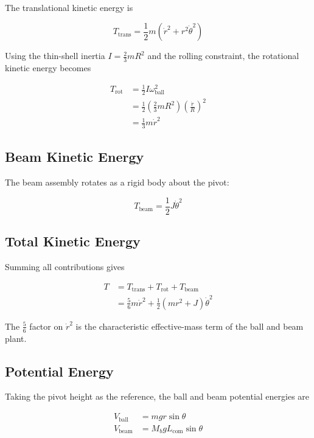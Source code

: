 The translational kinetic energy is

\begin{equation}
  T_{\text{trans}} = \frac{1}{2} m \left(\dot{r}^2 + r^2\dot{\theta}^2\right)
\end{equation}

Using the thin-shell inertia $I = \tfrac{2}{3}mR^2$ and the rolling constraint, the
rotational kinetic energy becomes

\begin{align}
  T_{\text{rot}}
  &= \frac{1}{2} I \omega_{\text{ball}}^2 \\
  &= \frac{1}{2}\left(\frac{2}{3}mR^2\right)\left(\frac{\dot{r}}{R}\right)^2 \\
  &= \frac{1}{3} m \dot{r}^2
\end{align}

\subsection{Beam Kinetic Energy}

The beam assembly rotates as a rigid body about the pivot:

\begin{equation}
  T_{\text{beam}} = \frac{1}{2} J \dot{\theta}^2
\end{equation}

\subsection{Total Kinetic Energy}

Summing all contributions gives

\begin{align}
  T
  &= T_{\text{trans}} + T_{\text{rot}} + T_{\text{beam}} \\
  &= \frac{5}{6}m\dot{r}^2 + \frac{1}{2}\left(mr^2 + J\right)\dot{\theta}^2
\end{align}

The $\tfrac{5}{6}$ factor on $\dot{r}^2$ is the characteristic effective-mass term of
the ball and beam plant.

\subsection{Potential Energy}

Taking the pivot height as the reference, the ball and beam potential energies are

\begin{align}
  V_{\text{ball}} &= mgr\sin\theta \\
  V_{\text{beam}} &= M_b g L_{\text{com}} \sin\theta
\end{align}

